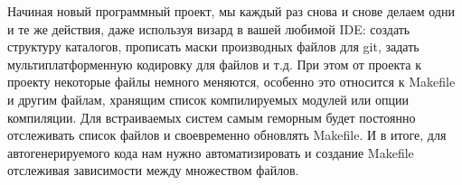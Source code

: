 {}\label{circfiles}


Начиная новый программный проект, мы каждый раз снова и снове делаем одни и те
же действия, даже используя визард в вашей любимой IDE: создать структуру
каталогов, прописать маски производных файлов для git, задать
мультиплатформенную кодировку для файлов и т.д. При этом от проекта к проекту
некоторые файлы немного меняются, особенно это относится к Makefile и другим
файлам, хранящим список компилируемых модулей или опции компиляции.
Для встраиваемых систем самым геморным будет постоянно отслеживать список файлов
и своевременно обновлять Makefile. И в итоге, для
автогенерируемого кода нам нужно автоматизировать и создание Makefile отслеживая
зависимости между множеством файлов.

